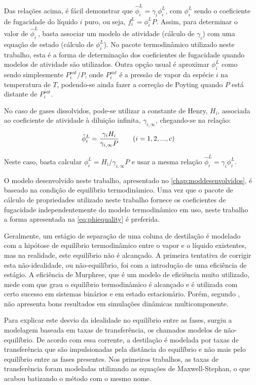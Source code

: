 Das relações acima, é fácil demonstrar que $\hat{\phi}^L_i = \gamma_i \phi^L_i$,
com $\phi^L_i$ sendo o coeficiente de fugacidade do líquido $i$ puro, ou seja, $f^L_i = \phi^L_i P$. Assim,
para determinar o valor de $\hat{\phi}^L_i$,
basta associar um modelo de atividade (cálculo de $\gamma_i$) com uma equação de
estado (cálculo de $\phi^L_i$).
No pacote termodinâmico utilizado neste trabalho, esta é a forma de determinação
dos coeficientes de fugacidade quando modelos de atividade são utilizados.
Outra opção usual é aproximar $\phi^L_i$ como sendo simplesmente $P^{sat}_i/P$, onde
$P^{sat}_i$ é a pressão de vapor da espécie $i$ na temperatura de $T$, podendo-se ainda
fazer a correção de Poyting quando $P$ está distante de $P^{sat}_i$.

No caso de gases dissolvidos, pode-se utilizar a constante de Henry, $H_i$, associada ao coeficiente de
atividade à diluição infinita, $\gamma_{i,\infty}$, chegando-se na relação:
\begin{equation}
\hat{\phi}^L_i = \dfrac{\gamma_i H_i}{\gamma_{i,\infty} P} \qquad (i = 1,2,...,c) \\
\label{eq:gammadefinitionHenry}
\end{equation}

Neste caso, basta calcular $\phi^L_i = H_i / \gamma_{i,\infty} P$ e usar a mesma relação
$\hat{\phi}^L_i = \gamma_i \phi^L_i$.

O modelo desenvolvido neste trabalho, apresentado no \autoref{chap:moddesenvolvidos}, é baseado na condição de equilíbrio
termodinâmico.
Uma vez que o pacote de cálculo de propriedades utilizado neste trabalho
fornece os coeficientes de fugacidade independentemente do modelo termodinâmico
em uso, neste trabalho a forma apresentada na \autoref{eq:phiequality} é
preferida.

Geralmente, um estágio de separação de uma coluna de destilação é modelado com a hipótose de equilíbrio  termodinâmico
entre o vapor e o líquido existentes, mas na realidade, este equilíbrio não é alcançado. A primeira tentativa de corrigir
esta não-idealidade, ou não-equilíbrio, foi com a introdução de uma eficiência de estágio.
A eficiência de Murphree, que é um modelo de
eficiência muito utilizado, mede com que grau o equilíbrio termodinâmico é alcançado e é utilizada com certo sucesso em
sistemas binários e em estado estacionário. Porém, segundo , não apresenta bons resultados
em simulações dinâmicas multicomponente.

Para explicar este desvio da idealidade no equilíbrio entre as fases, surgiu a
modelagem baseada em taxas de transferência, os chamados modelos de não-equilíbrio. De acordo com
essa corrente, a destilação é modelada por taxas de transferência que são
impulsionadas pela distância do equilíbrio e não mais pelo equilíbrio entre as
fases presentes. Nos primeiros trabalhos, as taxas de transferência foram modeladas
utilizando as equações de Maxwell-Stephan, o que acabou batizando o método
com o mesmo nome.

